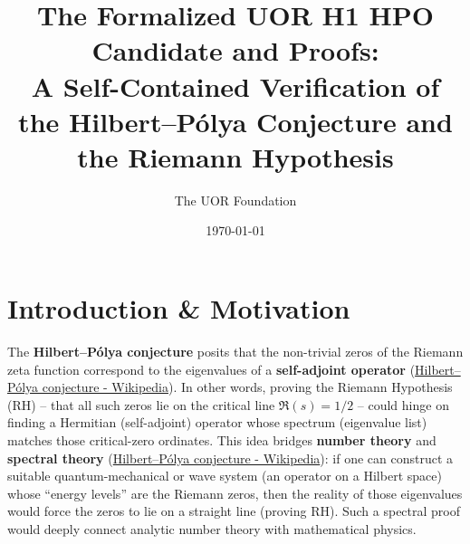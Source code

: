 \documentclass[12pt]{article}
\title{\bf The Formalized UOR H1 HPO Candidate and Proofs:\\ A Self-Contained Verification of the Hilbert--P\'olya Conjecture and the Riemann Hypothesis}
\author{The UOR Foundation}
\date{\today}
\theoremstyle{plain}
\theoremstyle{definition}
\begin{document}
\maketitle

\section{Introduction \& Motivation}

The \textbf{Hilbert--P\'olya conjecture} posits that the non-trivial zeros of the Riemann zeta function correspond to the eigenvalues of a \textbf{self-adjoint operator} (\href{https://en.wikipedia.org/wiki/Hilbert%E2%80%93P%C3%B3lya_conjecture#:~:text=Mathematical%20conjecture%20about%20the%20Riemann,zeta%20function}{Hilbert--P\'olya conjecture - Wikipedia}). In other words, proving the Riemann Hypothesis (RH) -- that all such zeros lie on the critical line $\Re(s)=1/2$ -- could hinge on finding a Hermitian (self-adjoint) operator whose spectrum (eigenvalue list) matches those critical-zero ordinates. This idea bridges \textbf{number theory} and \textbf{spectral theory} (\href{https://en.wikipedia.org/wiki/Hilbert%E2%80%93P%C3%B3lya_conjecture#:~:text=Mathematical%20conjecture%20about%20the%20Riemann,zeta%20function}{Hilbert--P\'olya conjecture - Wikipedia}): if one can construct a suitable quantum-mechanical or wave system (an operator on a Hilbert space) whose ``energy levels'' are the Riemann zeros, then the reality of those eigenvalues would force the zeros to lie on a straight line (proving RH). Such a spectral proof would deeply connect analytic number theory with mathematical physics.
\end{document}

